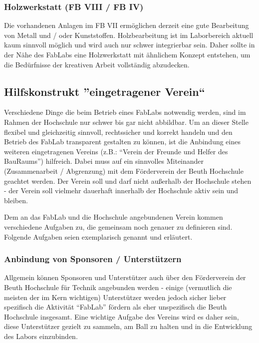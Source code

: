 \documentclass[parskip=half,headsepline,footsepline,titlepage]{scrartcl}
\begin{document}
\subsubsection{Holzwerkstatt (FB VIII / FB IV)}
Die vorhandenen Anlagen im FB VII ermöglichen derzeit eine gute Bearbeitung von Metall und / oder Kunststoffen. Holzbearbeitung ist im Laborbereich aktuell kaum sinnvoll möglich und wird auch nur schwer integrierbar sein. Daher sollte in der Nähe des FabLabs eine Holzwerkstatt mit ähnlichem Konzept entstehen, um die Bedürfnisse der kreativen Arbeit vollständig abzudecken.



\subsection{Hilfskonstrukt ''eingetragener Verein``}
Verschiedene Dinge die beim Betrieb eines FabLabs notwendig werden, sind im Rahmen der Hochschule nur schwer bis gar nicht abbildbar. Um an dieser Stelle flexibel und gleichzeitig sinnvoll, rechtssicher und korrekt handeln und den Betrieb des FabLab transparent gestalten zu können, ist die Anbindung eines weiteren eingetragenen Vereins (z.B.: ``Verein der Freunde und Helfer des BauRaums'') hilfreich. Dabei muss auf ein sinnvolles Miteinander (Zusammenarbeit / Abgrenzung) mit dem Förderverein der Beuth Hochschule geachtet werden.
Der Verein soll und darf nicht außerhalb der Hochschule stehen - der Verein soll vielmehr dauerhaft innerhalb der Hochschule aktiv sein und bleiben.

Dem an das FabLab und die Hochschule angebundenen Verein kommen verschiedene Aufgaben zu, die gemeinsam noch genauer zu definieren sind. Folgende Aufgaben seien exemplarisch genannt und erläutert.

\subsubsection{Anbindung von Sponsoren / Unterstützern\label{sssec:sponsoren}}
Allgemein können Sponsoren und Unterstützer auch über den Förderverein der Beuth Hochschule für Technik angebunden werden - einige (vermutlich die meisten der im Kern wichtigen) Unterstützer werden jedoch sicher lieber spezifisch die Aktivität ``FabLab'' fördern als eher unspezifisch die Beuth Hochschule insgesamt. Eine wichtige Aufgabe des Vereins wird es daher sein, diese Unterstützer gezielt zu sammeln, am Ball zu halten und in die Entwicklung des Labors einzubinden.
\end{document}
